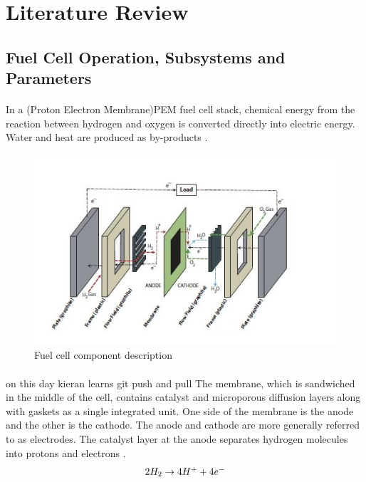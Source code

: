\section{Literature Review}
\subsection{Fuel Cell Operation, Subsystems and Parameters}
\paragraph{}In a (Proton Electron Membrane)PEM fuel cell stack, chemical energy from the reaction between hydrogen and oxygen is converted directly into electric energy. Water and heat are produced as by-products \cite{thanapalan_model_2011}.
\begin{figure}[!h]
\includegraphics{Figures/Figure5}
\caption{Fuel cell component description
\cite{stefanopoulou_mechatronics_nodate}}
\end{figure} 
\paragraph{}on this day kieran learns git push and pull
 The membrane, which is sandwiched in the middle of the cell, contains catalyst and microporous diffusion layers along with gaskets as a single integrated unit. One side of the membrane is  the anode and the other is the cathode. The anode and cathode are more generally referred to as electrodes. The catalyst layer at the anode separates hydrogen molecules into protons and electrons \cite{stefanopoulou_mechatronics_nodate}.
\begin{equation}
$$2H_{2} \rightarrow 4H^{+}+4e^{-}$$
\end{equation}
